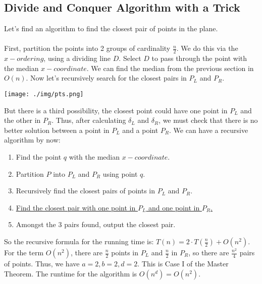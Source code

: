 \documentclass[11pt, a4paper, oneside]{book}
\theoremstyle{theoremdd}
\theoremstyle{remark}
\begin{document}
\subsection{Divide and Conquer Algorithm with a Trick}
Let's find an algorithm to find the closest pair of points in the plane. \\ \\
First, partition the points into 2 groups of cardinality $\frac{n}{2}$. We do this via the $x-ordering$, using a dividing line $D$. Select $D$ to pass through the point with the median $x-coordinate$. We can find the median from the previous section in $O(n)$. Now let's recursively search for the closest pairs in $P_{L}$ and $P_{R}$. 
\begin{center}
\texttt{[image: ./img/pts.png]}
\end{center}
But there is a third possibility, the closest point could have one point in $P_{L}$ and the other in $P_{R}$. Thus, after calculating $\delta_{L}$ and $\delta_{R}$, we must check that there is no better solution between a point in $P_{L}$ and a point $P_{R}$. We can have a recursive algorithm by now: 
\begin{enumerate}
	\item Find the point $q$ with the median $x-coordinate$.
	\item Partition $P$ into $P_{L}$ and $P_{R}$ using point $q$.
	\item Recursively find the closest pairs of points in $P_{L}$ and $P_{R}$.
	\item \underline{Find the closest pair with one point in $P_{L}$ and one point in $P_{R}$.}
	\item Amongst the 3 pairs found, output the closest pair. 
\end{enumerate}
So the recursive formula for the running time is: $T(n)=2\cdot T(\frac{n}{2})+O(n^2)$. For the term $O(n^2)$, there are $\frac{n}{2}$ points in $P_{L}$ and $\frac{n}{2}$ in $P_{R}$, so there are $\frac{n^2}{4}$ pairs of points. Thus, we have $a=2,b=2,d=2$. This is Case I of the Master Theorem. The runtime for the algorithm is $O(n^d)=O(n^2)$.
\end{document}
